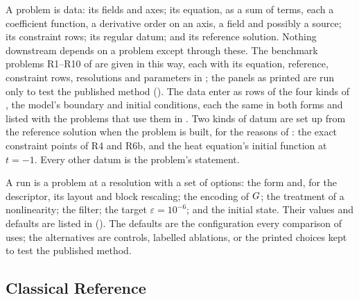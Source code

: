A problem is data: its fields and axes; its equation, as a sum of terms, each a coefficient function, a derivative order on an axis, a field and possibly a source; its constraint rows; its regular datum; and its reference solution. Nothing downstream depends on a problem except through these. The benchmark problems R1--R10 of  are given in this way, each with its equation, reference, constraint rows, resolutions and parameters in ; the panels as printed are run only to test the published method (). The data enter as rows of the four kinds of , the model's boundary and initial conditions, each the same in both forms and listed with the problems that use them in . Two kinds of datum are set up from the reference solution when the problem is built, for the reasons of : the exact constraint points of R4 and R6b, and the heat equation's initial function at $t=-1$. Every other datum is the problem's statement.

A run is a problem at a resolution with a set of options: the form and, for the descriptor, its layout and block rescaling; the encoding of $G$; the treatment of a nonlinearity; the filter; the target $\varepsilon=10^{-6}$; and the initial state. Their values and defaults are listed in  (). The defaults are the configuration every comparison of  uses; the alternatives are controls, labelled ablations, or the printed choices kept to test the published method.

\subsection{Classical Reference}
\label{sec:pipeline-reference}

